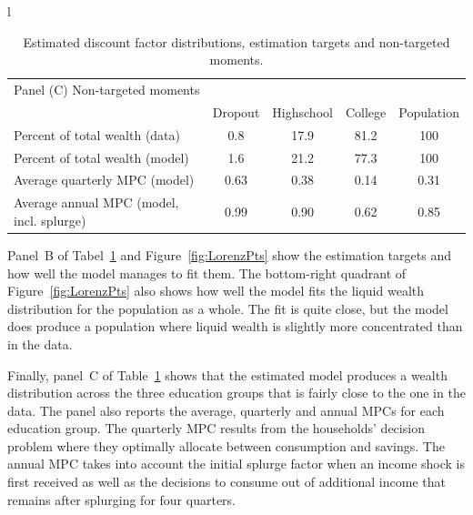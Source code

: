 \documentclass[11pt]{article}
\begin{document}
\begin{table}[th]
\begin{center}
\begin{tabular}{l}
	\begin{tabular}{lcccc}
	\multicolumn{5}{l}{Panel (C) Non-targeted moments} \\ 
	& Dropout & Highschool & College & Population \\ \midrule
	Percent of total wealth (data) & 0.8 & 17.9 & 81.2 & 100 \\
	Percent of total wealth (model) & 1.6 & 21.2 & 77.3 & 100 \\
	Average quarterly MPC (model) & 0.63 & 0.38 & 0.14 & 0.31 \\
	Average annual MPC (model, incl. splurge) & 0.99 & 0.90 & 0.62 & 0.85
	\\ \bottomrule 
\end{tabular}
\end{tabular}
\caption{Estimated discount factor distributions, estimation targets and non-targeted moments.}
\label{tab:estimBetas}
\end{center}
\end{table}

Panel~B of Tabel~\ref{tab:estimBetas} and Figure~\ref{fig:LorenzPts} show the estimation targets and how well the model manages to fit them. The bottom-right quadrant of Figure~\ref{fig:LorenzPts} also shows how well the model fits the liquid wealth distribution for the population as a whole. The fit is quite close, but the model does produce a population where liquid wealth is slightly more concentrated than in the data. 

Finally, panel~C of Table~\ref{tab:estimBetas} shows that the estimated model produces a wealth distribution across the three education groups that is fairly close to the one in the data. The panel also reports the average, quarterly and annual MPCs for each education group. The quarterly MPC results from the households' decision problem where they optimally allocate between consumption and savings. The annual MPC takes into account the initial splurge factor when an income shock is first received as well as the decisions to consume  out of additional income that remains after splurging for four quarters. 
\end{document}
